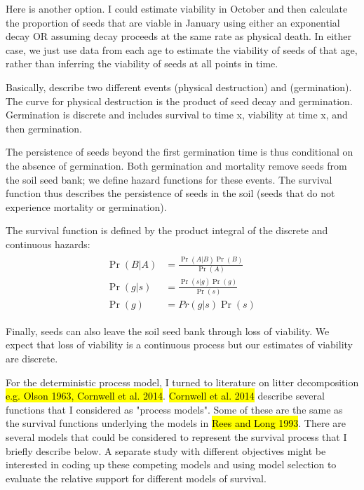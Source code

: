 \documentclass[12pt, oneside, titlepage]{article}   	%
\begin{document}
Here is another option. I could estimate viability in October and then calculate the proportion of seeds that are viable in January using either an exponential decay OR assuming decay proceeds at the same rate as physical death. In either case, we just use data from each age to estimate the viability of seeds of that age, rather than inferring the viability of seeds at all points in time. 

Basically, describe two different events (physical destruction) and (germination). The curve for physical destruction is the product of seed decay and germination. Germination is discrete and includes survival to time x, viability at time x, and then germination. 

The persistence of seeds beyond the first germination time is thus conditional on the absence of germination. Both germination and mortality remove seeds from the soil seed bank; we define hazard functions for these events. The survival function thus describes the persistence of seeds in the soil (seeds that do not experience mortality or germination).

The survival function is defined by the product integral of the discrete and continuous hazards:
%
\begin{align}
  \begin{split}
\Pr( B|A )  & = \frac{\Pr( A|B ) \Pr( B )}{ \Pr ( A )} \\
\Pr( g | s )  & = \frac{\Pr( s | g ) \Pr( g )}{ \Pr ( s )} \\ 
 \Pr( g ) & = Pr( g | s ) \Pr( s ) \
  \end{split}
\end{align}
%

Finally, seeds can also leave the soil seed bank through loss of viability. We expect that loss of viability is a continuous process but our estimates of viability are discrete.

 For the deterministic process model, I turned to literature on litter decomposition \hl{e.g. Olson 1963, Cornwell et al. 2014}. \hl{Cornwell et al. 2014} describe several functions that I considered as "process models". Some of these are the same as the survival functions underlying the models in \hl{Rees and Long 1993}. There are several models that could be considered to represent the survival process that I briefly describe below. A separate study with different objectives might be interested in coding up these competing models and using model selection to evaluate the relative support for different models of survival. 
\end{document}
